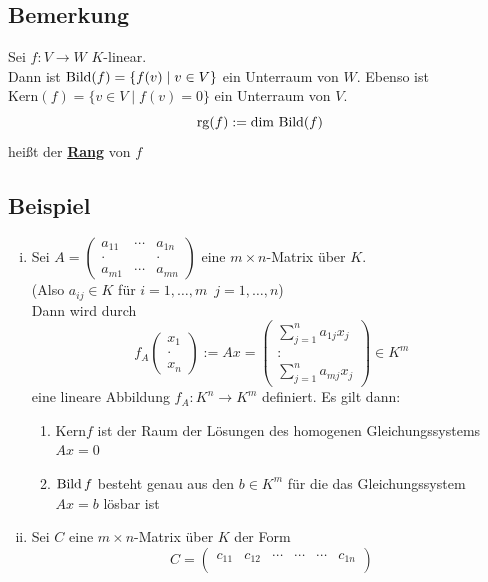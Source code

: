 \subsection{Bemerkung} %
\label{sub:bemerkung}
Sei $f: V \to W$ \(K\)-linear. \\
Dann ist $\operatorname{Bild} (f) = \{ f(v) \mid v \in V \}$ ein Unterraum von $W$. 
Ebenso ist $ \text{Kern} (f) =  \{ v \in V \mid f(v) = 0 \} $ ein Unterraum von $V$.
\[
	\operatorname{rg} (f) := \dim \, \operatorname{Bild}(f)
\]
heißt der \underline{\textbf{Rang}} von $f$

\subsection{Beispiel} %
\label{sub:beispiel}
\begin{enumerate}[(i)]
	\item Sei $A=\left(
		\begin{smallmatrix}
			a_{11} & \cdots & a_{1n} \\
			\cdot  && \cdot \\
			a_{m1} & \cdots & a_{mn}
		\end{smallmatrix} \right)$
		eine $m \times n$-Matrix über $K$. \\
		{\small (Also $a_{ij} \in K$ für $i=1, \ldots  , m \enspace j=1, \ldots , n$)} \\
		Dann wird durch 
		\[
			f_A \left( \begin{smallmatrix} x_1 \\ \cdot \\x_n \end{smallmatrix} \right) := A x = \begin{pmatrix}
				\sum\limits_{j=1}^{n} a_{1j} x_j \\ : \\\sum\limits_{j=1}^{n} a_{mj} x_j
			\end{pmatrix} \in K^m
		\]
		eine lineare Abbildung $f_A : K^n \to K^m$ definiert. Es gilt dann:
		\begin{enumerate}[(1)]
			\item Kern$f$ ist der Raum der Lösungen des homogenen Gleichungssystems $Ax=0$
			\item $\operatorname{Bild} f$ besteht genau aus den $b \in K^m$ für die das Gleichungssystem $Ax=b$ lösbar ist
		\end{enumerate}
	\item Sei $C$ eine $m \times n$-Matrix über $K$ der Form
	\[
		C= \begin{pmatrix}
			c_{11} & c_{12} & \cdots & \cdots & \cdots & c_{1n} \\

\end{pmatrix}\]
\end{enumerate}
